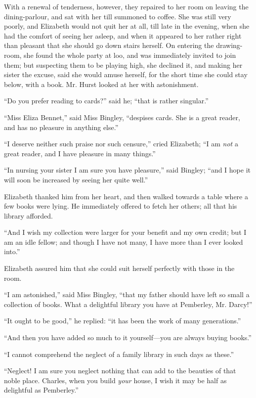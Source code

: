\documentclass[12pt]{book}
\begin{document}
With a renewal of tenderness, however, they repaired to her room on leaving the dining-parlour, and sat with her till summoned to coffee. She was still very poorly, and Elizabeth would not quit her at all, till late in the evening, when she had the comfort of seeing her asleep, and when it appeared to her rather right than pleasant that she should go down stairs herself. On entering the drawing-room, she found the whole party at loo, and was immediately invited to join them; but suspecting them to be playing high, she declined it, and making her sister the excuse, said she would amuse herself, for the short time she could stay below, with a book. Mr. Hurst looked at her with astonishment.

``Do you prefer reading to cards?'' said he; ``that is rather singular.''

``Miss Eliza Bennet,'' said Miss Bingley, ``despises cards. She is a great reader, and has no pleasure in anything else.''

``I deserve neither such praise nor such censure,'' cried Elizabeth; ``I am \textit{not} a great reader, and I have pleasure in many things.''

``In nursing your sister I am sure you have pleasure,'' said Bingley; ``and I hope it will soon be increased by seeing her quite well.''

Elizabeth thanked him from her heart, and then walked towards a table where a few books were lying. He immediately offered to fetch her others; all that his library afforded.

``And I wish my collection were larger for your benefit and my own credit; but I am an idle fellow; and though I have not many, I have more than I ever looked into.''

Elizabeth assured him that she could suit herself perfectly with those in the room.

``I am astonished,'' said Miss Bingley, ``that my father should have left so small a collection of books. What a delightful library you have at Pemberley, Mr. Darcy!''

``It ought to be good,'' he replied: ``it has been the work of many generations.''

``And then you have added so much to it yourself---you are always buying books.''

``I cannot comprehend the neglect of a family library in such days as these.''

``Neglect! I am sure you neglect nothing that can add to the beauties of that noble place. Charles, when you build \textit{your} house, I wish it may be half as delightful as Pemberley.''
\end{document}
